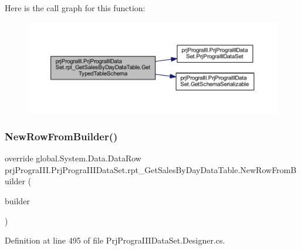 Here is the call graph for this function\+:
\nopagebreak
\begin{figure}[H]
\begin{center}
\leavevmode
\includegraphics[width=350pt]{classprj_progra_i_i_i_1_1_prj_progra_i_i_i_data_set_1_1rpt___get_sales_by_day_data_table_aa810ec728b5c4bff390868aab376d9ea_cgraph}
\end{center}
\end{figure}
\hypertarget{classprj_progra_i_i_i_1_1_prj_progra_i_i_i_data_set_1_1rpt___get_sales_by_day_data_table_a363d9811719bbf2c764baff0b125c964}{}\label{classprj_progra_i_i_i_1_1_prj_progra_i_i_i_data_set_1_1rpt___get_sales_by_day_data_table_a363d9811719bbf2c764baff0b125c964} 
\subsubsection{\texorpdfstring{New\+Row\+From\+Builder()}{NewRowFromBuilder()}}
{\footnotesize\ttfamily override global.\+System.\+Data.\+Data\+Row prj\+Progra\+I\+I\+I.\+Prj\+Progra\+I\+I\+I\+Data\+Set.\+rpt\+\_\+\+Get\+Sales\+By\+Day\+Data\+Table.\+New\+Row\+From\+Builder (\begin{DoxyParamCaption}\item[{global\+::\+System.\+Data.\+Data\+Row\+Builder}]{builder }\end{DoxyParamCaption})\hspace{0.3cm}{\ttfamily [protected]}}



Definition at line 495 of file Prj\+Progra\+I\+I\+I\+Data\+Set.\+Designer.\+cs.

